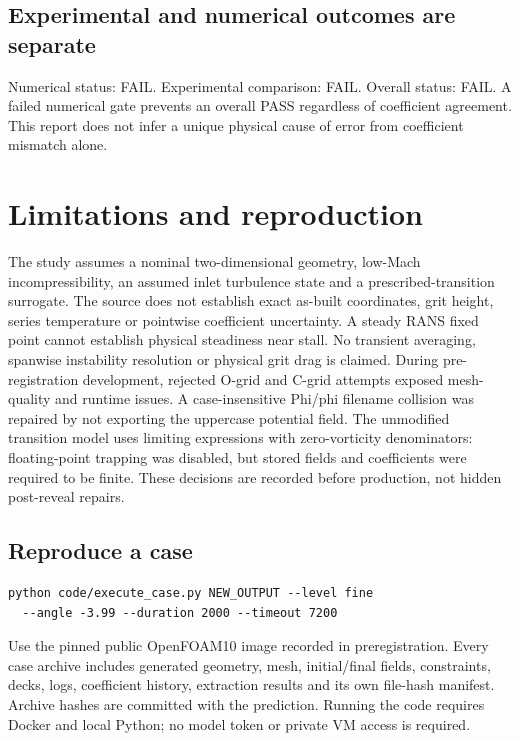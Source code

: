 \documentclass[10pt]{article}
\begin{document}
\subsection{Experimental and numerical outcomes are separate}
Numerical status: FAIL. Experimental comparison: FAIL. Overall status: FAIL. A failed numerical gate prevents an overall PASS regardless of coefficient agreement. This report does not infer a unique physical cause of error from coefficient mismatch alone.
\clearpage\section{Limitations and reproduction}
The study assumes a nominal two-dimensional geometry, low-Mach incompressibility, an assumed inlet turbulence state and a prescribed-transition surrogate. The source does not establish exact as-built coordinates, grit height, series temperature or pointwise coefficient uncertainty. A steady RANS fixed point cannot establish physical steadiness near stall. No transient averaging, spanwise instability resolution or physical grit drag is claimed.
During pre-registration development, rejected O-grid and C-grid attempts exposed mesh-quality and runtime issues. A case-insensitive Phi/phi filename collision was repaired by not exporting the uppercase potential field. The unmodified transition model uses limiting expressions with zero-vorticity denominators: floating-point trapping was disabled, but stored fields and coefficients were required to be finite. These decisions are recorded before production, not hidden post-reveal repairs.
\subsection{Reproduce a case}
\begin{verbatim}python code/execute_case.py NEW_OUTPUT --level fine
  --angle -3.99 --duration 2000 --timeout 7200
\end{verbatim}
Use the pinned public OpenFOAM10 image recorded in preregistration. Every case archive includes generated geometry, mesh, initial/final fields, constraints, decks, logs, coefficient history, extraction results and its own file-hash manifest. Archive hashes are committed with the prediction. Running the code requires Docker and local Python; no model token or private VM access is required.
\end{document}
